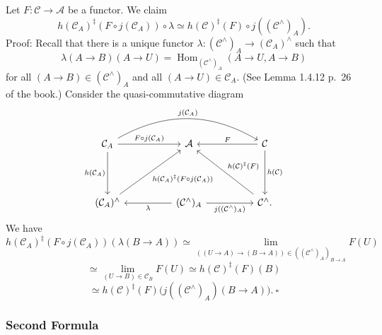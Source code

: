 \documentclass[12pt]{article}%
\theoremstyle{remark}
\theoremstyle{definition}
\newcommand{\A}{\mathcal A}
\newcommand{\C}{\mathcal C}
\DeclareMathOperator{\Hom}{Hom}%
\begin{document}
Let $F:\C\to\A$ be a functor. We claim 
\begin{equation}\label{prepa1}
h(\C_A)^\ddagger(F\circ j(\C_A))\circ\lambda\simeq h(\C)^\ddagger(F)\circ j((\C^\wedge)_A).
\end{equation}
Proof: Recall that there is a unique functor $\lambda:(\C^\wedge)_A\to(\C_A)^\wedge$ such that 
\begin{equation}\label{lambda}
\lambda(A\to B)(A\to U)=\Hom_{(\C^\wedge)_A}(A\to U,A\to B)
\end{equation} 
for all $(A\to B)\in(\C^\wedge)_A$ and all $(A\to U)\in\C_A$. (See Lemma 1.4.12 p.~26 of the book.) Consider the quasi-commutative diagram 
$$
\begin{tikzcd}
\C_A\ar[bend left]{rrrr}{j(\C_A)}\ar{rr}{F\circ j(\C_A)}\ar{dd}[swap]{h(\C_A)}&&\A&&\C\ar{ll}[swap]{F}\ar{dd}{h(\C)}\\ 
{}\\ 
(\C_A)^\wedge\ar{uurr}[swap]{h(\C_A)^\ddagger(F\circ j(\C_A))}&&(\C^\wedge)_A\ar{ll}{\lambda}\ar{rr}[swap]{j((\C^\wedge)_A)}&&\C^\wedge.\ar{uull}[swap]{h(\C)^\ddagger(F)}
\end{tikzcd}
$$
We have 
$$
h(\C_A)^\ddagger(F\circ j(\C_A))(\lambda(B\to A))\simeq\lim_{((U\to A)\to(B\to A))\in((\C^\wedge)_A)_{B\to A}}F(U)
$$
$$
\simeq\lim_{(U\to B)\in\C_B}F(U)\simeq h(\C)^\ddagger(F)(B)
$$ 
$$
\simeq h(\C)^\ddagger(F)\Big(j((\C^\wedge)_A)(B\to A)\Big).\ \square
$$

\subsubsection{Second Formula}
\end{document}
